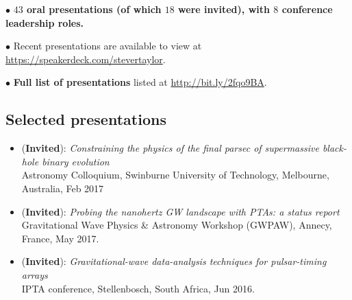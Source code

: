 \documentclass[11pt,letterpaper,sans]{moderncv}
\begin{document}
$\bullet$ \textbf{$43$ oral presentations (of which $18$ were invited), with $8$ conference leadership roles.}

$\bullet$ Recent presentations are available to view at {\color{color1} \href{https://speakerdeck.com/stevertaylor}{https://speakerdeck.com/stevertaylor}}.

$\bullet$ \textbf{Full list of presentations} listed at {\color{color1} \href{http://bit.ly/2fqo9BA}{http://bit.ly/2fqo9BA}}.

\subsection{Selected presentations}

\begin{itemize}[leftmargin=8mm]

\item (\textbf{Invited}): \textit{Constraining the physics of the final parsec of supermassive black-hole binary evolution} \\ Astronomy Colloquium, Swinburne University of Technology, Melbourne, Australia, Feb 2017

\item (\textbf{Invited}): \textit{Probing the nanohertz GW landscape with PTAs: a status report} \\ Gravitational Wave Physics \& Astronomy Workshop (GWPAW), Annecy, France, May 2017.

\item (\textbf{Invited}): \textit{Gravitational-wave data-analysis techniques for pulsar-timing arrays} \\ IPTA conference, Stellenbosch, South Africa, Jun 2016.

\end{itemize}
\end{document}
